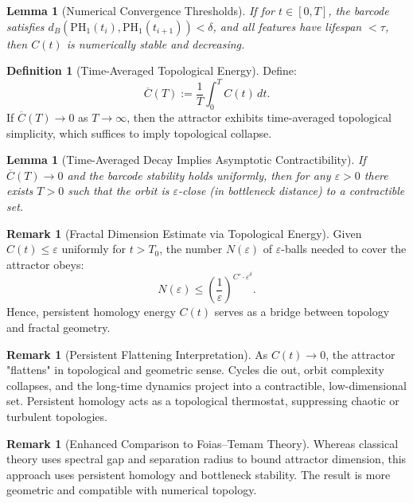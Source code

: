 \documentclass[11pt]{article}
\newtheorem{lemma}[theorem]{Lemma}
\theoremstyle{definition}
\newtheorem{definition}[theorem]{Definition}
\newtheorem{remark}[theorem]{Remark}
\begin{document}
\begin{lemma}[Numerical Convergence Thresholds]
If for $t \in [0, T]$, the barcode satisfies $d_B(\mathrm{PH}_1(t_{i}), \mathrm{PH}_1(t_{i+1})) < \delta$, and all features have lifespan $< \tau$, then $C(t)$ is numerically stable and decreasing.
\end{lemma}

\begin{definition}[Time-Averaged Topological Energy]
Define:
\[
\overline{C}(T) := \frac{1}{T} \int_0^T C(t)\,dt.
\]
If $\overline{C}(T) \to 0$ as $T \to \infty$, then the attractor exhibits time-averaged topological simplicity, which suffices to imply topological collapse.
\end{definition}

\begin{lemma}[Time-Averaged Decay Implies Asymptotic Contractibility]
If $\overline{C}(T) \to 0$ and the barcode stability holds uniformly, then for any $\varepsilon > 0$ there exists $T > 0$ such that the orbit is $\varepsilon$-close (in bottleneck distance) to a contractible set.
\end{lemma}

\begin{remark}[Fractal Dimension Estimate via Topological Energy]
Given $C(t) \le \varepsilon$ uniformly for $t > T_0$, the number $N(\varepsilon)$ of $\varepsilon$-balls needed to cover the attractor obeys:
\[
N(\varepsilon) \le \left(\frac{1}{\varepsilon}\right)^{C' \cdot \varepsilon^\delta}.
\]
Hence, persistent homology energy $C(t)$ serves as a bridge between topology and fractal geometry.
\end{remark}

\begin{remark}[Persistent Flattening Interpretation]
As $C(t) \to 0$, the attractor "flattens" in topological and geometric sense. Cycles die out, orbit complexity collapses, and the long-time dynamics project into a contractible, low-dimensional set. Persistent homology acts as a topological thermostat, suppressing chaotic or turbulent topologies.
\end{remark}

\begin{remark}[Enhanced Comparison to Foias--Temam Theory]
Whereas classical theory uses spectral gap and separation radius to bound attractor dimension, this approach uses persistent homology and bottleneck stability. The result is more geometric and compatible with numerical topology.
\end{remark}
\end{document}
